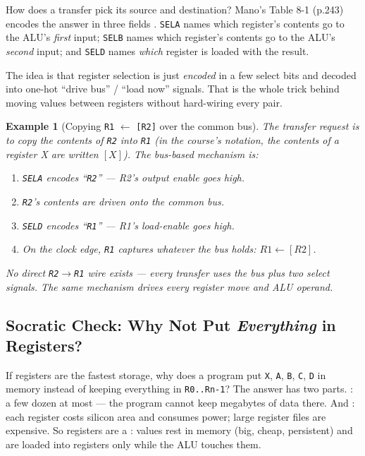 \documentclass[11pt]{article}
\newtheorem{example}{Example}[section]
\begin{document}
How does a transfer pick its source and destination? Mano's Table 8-1 (p.243) encodes the answer in three fields \cite{Mano1993_computer_system_architecture}. \texttt{SELA} names which register's contents go to the ALU's \emph{first} input; \texttt{SELB} names which register's contents go to the ALU's \emph{second} input; and \texttt{SELD} names \emph{which} register is loaded with the result.

The idea is that register selection is just \emph{encoded} in a few select bits and decoded into one-hot ``drive bus'' / ``load now'' signals. That is the whole trick behind moving values between registers without hard-wiring every pair.

\begin{example}[Copying \texttt{R1} $\gets$ \texttt{[R2]} over the common bus]
The transfer request is to copy the \emph{contents} of \texttt{R2} into \texttt{R1} (in the course's notation, the contents of a register X are written $[X]$). The bus-based mechanism is:
\begin{enumerate}
  \item \texttt{SELA} encodes ``\texttt{R2}'' --- R2's output enable goes high.
  \item \texttt{R2}'s contents are driven onto the common bus.
  \item \texttt{SELD} encodes ``\texttt{R1}'' --- R1's load-enable goes high.
  \item On the clock edge, \texttt{R1} captures whatever the bus holds: $R1 \gets [R2]$.
\end{enumerate}
No direct \texttt{R2}$\to$\texttt{R1} wire exists --- every transfer uses the bus plus two select signals. The same mechanism drives every register move and ALU operand.
\end{example}

\subsection{Socratic Check: Why Not Put \emph{Everything} in Registers?}

If registers are the fastest storage, why does a program put \texttt{X}, \texttt{A}, \texttt{B}, \texttt{C}, \texttt{D} in memory instead of keeping everything in \texttt{R0..Rn-1}? The answer has two parts. : a few dozen at most --- the program cannot keep megabytes of data there. And : each register costs silicon area and consumes power; large register files are expensive. So registers are a : values rest in memory (big, cheap, persistent) and are loaded into registers only while the ALU touches them.
\end{document}
